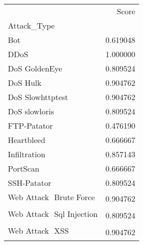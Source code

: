 \begin{tabular}{lr}
\toprule
{} &     Score \\
Attack\_Type                &           \\
\midrule
Bot                        &  0.619048 \\
DDoS                       &  1.000000 \\
DoS GoldenEye              &  0.809524 \\
DoS Hulk                   &  0.904762 \\
DoS Slowhttptest           &  0.904762 \\
DoS slowloris              &  0.809524 \\
FTP-Patator                &  0.476190 \\
Heartbleed                 &  0.666667 \\
Infiltration               &  0.857143 \\
PortScan                   &  0.666667 \\
SSH-Patator                &  0.809524 \\
Web Attack  Brute Force   &  0.904762 \\
Web Attack  Sql Injection &  0.809524 \\
Web Attack  XSS           &  0.904762 \\
\bottomrule
\end{tabular}
